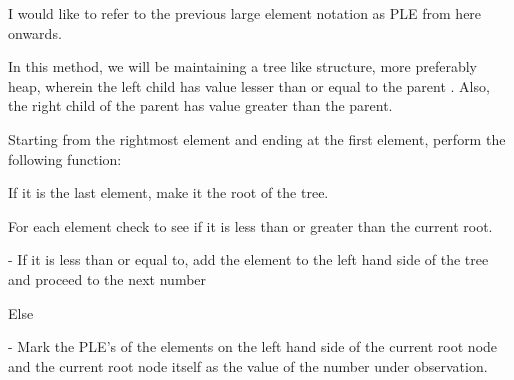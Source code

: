 \documentclass[letterpaper,portrait,12pt]{article}
\begin{document}
\begin{flushleft}
I would like to refer to the previous large element notation as PLE from here onwards.
\end{flushleft}


\begin{flushleft}
	
\end{flushleft}


\begin{flushleft}
In this method, we will be maintaining a tree like structure, more preferably heap, wherein the left child has value lesser than or equal to the parent . Also, the right child of the parent has value greater than the parent.
\end{flushleft}


\begin{flushleft}

\end{flushleft}


\begin{flushleft}
Starting from the rightmost element and ending at the first element, perform the following function:
\end{flushleft}


\begin{flushleft}

\end{flushleft}


\begin{flushleft}
	If it is the last element, make it the root of the tree.
\end{flushleft}


\begin{flushleft}
	For each element check to see if it is less than or greater than the current root.
\end{flushleft}


\begin{flushleft}
- If it is less than or equal to, add the element to the left hand side of the tree and  proceed to the next number
\end{flushleft}


\begin{flushleft}
		Else 
\end{flushleft}


\begin{flushleft}
- Mark the PLE's of the elements on the left hand side of the current root node and the current root node itself as the value of the number under observation.
\end{flushleft}
\end{document}
